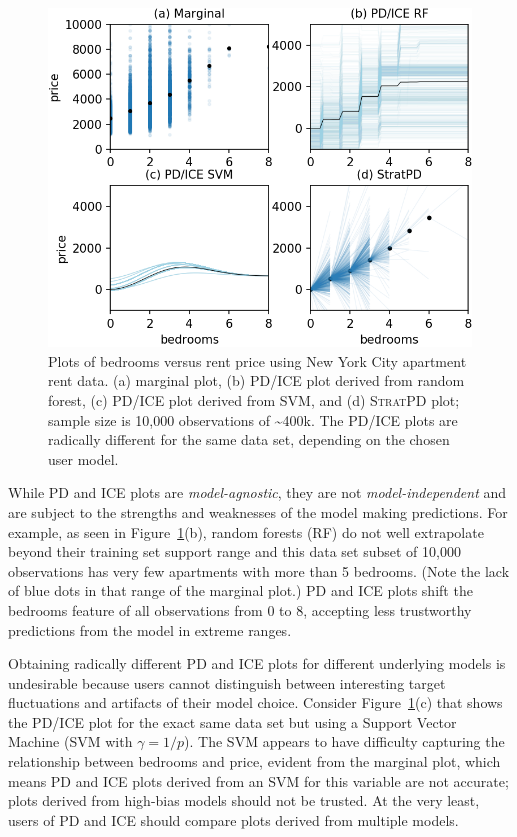 \documentclass[12pt]{article}
\newcommand{\figref}[1]{Figure~\ref{#1}}
\newcommand{\spd}{\fontfamily{cmr}\textsc{\small StratPD}}
\begin{document}
\begin{figure}[htbp]
\begin{center}
\includegraphics[scale=0.7]{images/bedrooms_vs_price.png}
\caption{Plots of bedrooms versus rent price using New York City apartment rent data. (a) marginal plot, (b) PD/ICE plot derived from random forest, (c) PD/ICE plot derived from SVM, and (d) \spd{} plot; sample size is 10,000 observations of \textasciitilde400k. The PD/ICE plots are radically different for the same data set, depending on the chosen user model.}
\label{fig:baths_price}
\end{center}
\end{figure}

While PD and ICE plots are {\em model-agnostic}, they are not {\em model-independent} and are subject to the strengths and weaknesses of the model making predictions. For example, as seen in \figref{fig:baths_price}(b), random forests (RF) do not well extrapolate beyond their training set support range and this data set subset of 10,000 observations has very few apartments with more than 5 bedrooms. (Note the lack of blue dots in that range of the marginal plot.) PD and ICE plots shift the bedrooms feature of all observations from 0 to 8, accepting less trustworthy predictions from the model in extreme ranges.   

Obtaining radically different PD and ICE plots for different underlying models is undesirable because users cannot distinguish between interesting target fluctuations and artifacts of their model choice. Consider \figref{fig:baths_price}(c) that shows the PD/ICE plot for the exact same data set but using a Support Vector Machine (SVM with $\gamma=1/p$). The SVM appears to have difficulty capturing the relationship between bedrooms and price, evident from the marginal plot, which means PD and ICE plots derived from an SVM for this variable are not accurate; plots derived from high-bias models should not be trusted. At the very least, users of PD and ICE should compare plots derived from multiple models. 
\end{document}
